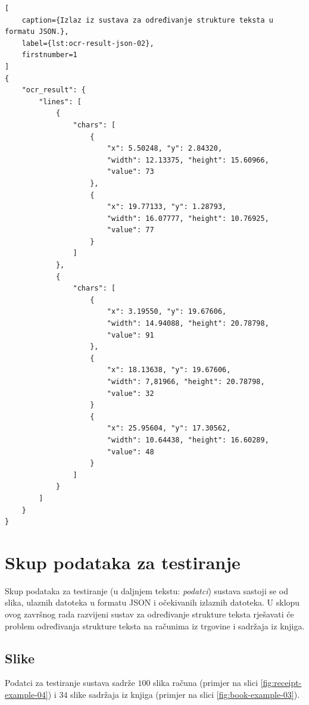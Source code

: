 \documentclass[times, utf8, zavrsni]{fer}
\begin{document}
\begin{lstlisting}[
    caption={Izlaz iz sustava za određivanje strukture teksta u formatu JSON.},
    label={lst:ocr-result-json-02},
    firstnumber=1
]
{
    "ocr_result": {
        "lines": [
            {
                "chars": [
                    {
                        "x": 5.50248, "y": 2.84320,
                        "width": 12.13375, "height": 15.60966,
                        "value": 73
                    },
                    {
                        "x": 19.77133, "y": 1.28793,
                        "width": 16.07777, "height": 10.76925,
                        "value": 77
                    }
                ]
            },
            {
                "chars": [
                    {
                        "x": 3.19550, "y": 19.67606,
                        "width": 14.94088, "height": 20.78798,
                        "value": 91
                    },
                    {
                        "x": 18.13638, "y": 19.67606,
                        "width": 7,81966, "height": 20.78798,
                        "value": 32
                    }
                    {
                        "x": 25.95604, "y": 17.30562,
                        "width": 10.64438, "height": 16.60289,
                        "value": 48
                    }
                ]
            }
        ]
    }
}
\end{lstlisting}








\section{Skup podataka za testiranje}
\label{sec:skup-padataka-za-testiranje}
Skup podataka za testiranje (u daljnjem tekstu: \emph{podatci})
sustava sastoji se od slika, ulaznih datoteka u formatu JSON i
očekivanih izlaznih datoteka. U sklopu ovog završnog rada razvijeni sustav za
određivanje strukture teksta rješavati će problem određivanja strukture teksta
na računima iz trgovine i sadržaja iz knjiga.




\subsection{Slike}
\label{subsec:slike}
Podatci za testiranje sustava sadrže $100$ slika računa (primjer na slici
\ref{fig:receipt-example-04}) i $34$ slike sadržaja iz knjiga (primjer na slici
\ref{fig:book-example-03}).
\end{document}
